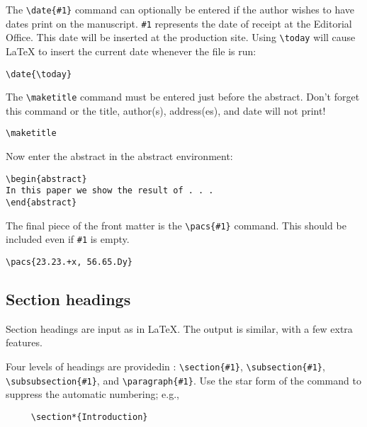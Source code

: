 The \verb+\date{#1}+ command can optionally be entered if the author wishes
to have dates print on the manuscript. \verb+#1+ represents the date of
receipt at the Editorial Office. This date will be inserted at the
production site. Using \verb+\today+ will cause \LaTeX{} to insert the
current date whenever the file is run:
\begin{verbatim}
\date{\today}
\end{verbatim}
The \verb+\maketitle+ command must be entered just before the abstract.
Don't forget this command or the title, author(s), address(es), and date
will not print!
\begin{verbatim}
\maketitle
\end{verbatim}
Now enter the abstract in the abstract environment:
\begin{verbatim}
\begin{abstract}
In this paper we show the result of . . .
\end{abstract}
\end{verbatim}
The final piece of the front matter is the \verb+\pacs{#1}+ command. This
should be included even if \verb+#1+ is empty.
\begin{verbatim}
\pacs{23.23.+x, 56.65.Dy}
\end{verbatim}

\subsection{Section headings}

Section headings are input as in \LaTeX. The output is similar, with a few
extra features.

Four levels of headings are provided\break in \REVTeX{}:
\verb+\section{#1}+, \verb+\subsection{#1}+, \verb+\subsubsection{#1}+, and
\verb+\paragraph{#1}+. Use the star form of the command to suppress the
automatic numbering; e.g.,
\begin{verbatim}
     \section*{Introduction}
\end{verbatim}

